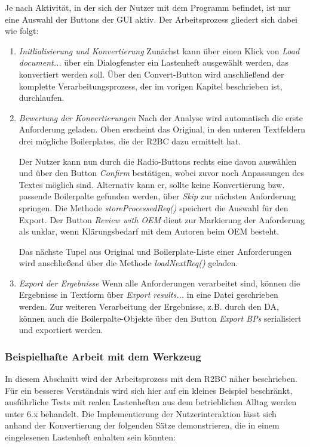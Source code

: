 \documentclass[12pt]{report}
\begin{document}
Je nach Aktivität, in der sich der Nutzer mit dem Programm befindet, ist nur eine Auswahl der Buttons der GUI aktiv. Der Arbeitsprozess gliedert sich dabei wie folgt:
\begin{enumerate}
\item \textit{Initlialisierung und Konvertierung} Zunächst kann über einen Klick von \textit{Load document...} über ein Dialogfenster ein Lastenheft ausgewählt werden, das konvertiert werden soll. Über den Convert-Button wird anschließend der komplette Verarbeitungsprozess, der im vorigen Kapitel beschrieben ist, durchlaufen.
\item \textit{Bewertung der Konvertierungen} Nach der Analyse wird automatisch die erste Anforderung geladen. Oben erscheint das Original, in den unteren Textfeldern drei mögliche Boilerplates, die der R2BC dazu ermittelt hat. 

Der Nutzer kann nun durch die Radio-Buttons rechts eine davon auswählen und über den Button \textit{Confirm} bestätigen, wobei zuvor noch Anpassungen des Textes möglich sind. Alternativ kann er, sollte keine Konvertierung bzw. passende Boilerpalte gefunden werden, über \textit{Skip} zur nächsten Anforderung springen. Die Methode \textit{storeProcessedReq()} speichert die Auswahl für den Export. Der Button \textit{Review with OEM} dient zur Markierung der Anforderung als unklar, wenn Klärungsbedarf mit dem Autoren beim OEM besteht. 

Das nächste Tupel aus Original und Boilerplate-Liste einer Anforderungen wird anschließend über die Methode \textit{loadNextReq()} geladen.
\item \textit{Export der Ergebnisse} Wenn alle Anforderungen verarbeitet sind, können die Ergebnisse in Textform über \textit{Export results...} in eine Datei geschrieben werden. Zur weiteren Verarbeitung der Ergebnisse, z.B. durch den DA, können auch die Boilerpalte-Objekte über den Button \textit{Export BPs} serialisiert und exportiert werden.
\end{enumerate}

\subsubsection{Beispielhafte Arbeit mit dem Werkzeug}
In diesem Abschnitt wird der Arbeitsprozess mit dem R2BC näher beschrieben.
Für ein besseres Verständnis wird sich hier auf ein kleines Beispiel beschränkt, ausführliche Tests mit realen Lastenheften aus dem betrieblichen Alltag werden unter 6.x behandelt. Die Implementierung der Nutzerinteraktion lässt sich anhand der Konvertierung der folgenden Sätze demonstrieren, die in einem eingelesenen Lastenheft enhalten sein könnten:\\
\end{document}
